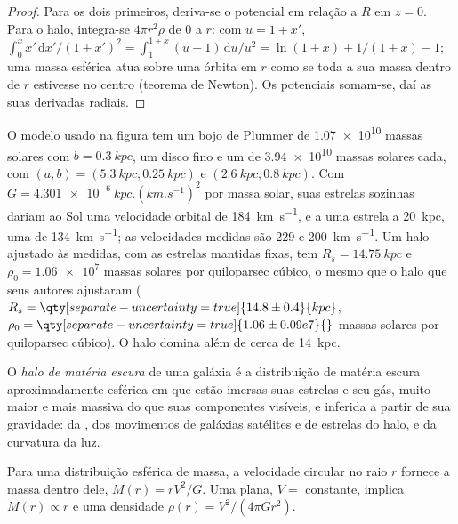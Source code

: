 \begin{proof}
Para os dois primeiros, deriva-se o potencial em relação a $R$ em
$z = 0$. Para o halo, integra-se $4\pi r^2\rho$ de 0 a $r$: com
$u = 1 + x'$, $\int_0^x x'\,\mathrm{d}x'/(1 + x')^2 =
\int_1^{1+x}(u - 1)\,\mathrm{d}u/u^2 = \ln(1 + x) + 1/(1 + x) - 1$; uma
massa esférica atua sobre uma órbita em $r$ como se toda a sua massa dentro de $r$ estivesse
no centro (teorema de Newton). Os potenciais somam-se, daí as suas
derivadas radiais.
\end{proof}

O modelo usado na figura tem um bojo de Plummer de
\num{1.07e10} massas solares com $b = \qty{0.3}{kpc}$, um disco fino e um
 de \num{3.94e10} massas solares cada, com $(a, b) =
(\qty{5.3}{kpc}, \qty{0.25}{kpc})$ e $(\qty{2.6}{kpc}, \qty{0.8}{kpc})$.
Com $G = \qty{4.301e-6}{kpc.(km.s^{-1})^2}$ por massa solar, suas estrelas
sozinhas dariam ao Sol uma velocidade orbital de \qty{184}{km.s^{-1}}, e
a uma estrela a \qty{20}{kpc}, uma de \qty{134}{km.s^{-1}}; as velocidades medidas são
229 e \qty{200}{km.s^{-1}}. Um halo ajustado às medidas, com as
estrelas mantidas fixas, tem $R_s = \qty{14.75}{kpc}$ e
$\rho_0 = \num{1.06e7}$ massas solares por quiloparsec cúbico, o mesmo que
o halo que seus autores ajustaram ($R_s = \qty[separate-uncertainty=true]{14.8 \pm 0.4}{kpc}$,
$\rho_0 = \qty[separate-uncertainty=true]{1.06 \pm 0.09 e7}{}$ massas solares
por quiloparsec cúbico). O halo domina além de cerca de \qty{14}{kpc}.

\begin{definition}\label{def:b3:milky-way-galaxies:halo}
O \emph{halo de matéria escura} de uma galáxia é a
distribuição de matéria escura aproximadamente esférica em que estão imersas suas estrelas e seu gás,
muito maior e mais massiva do que suas componentes visíveis,
e inferida a partir de sua gravidade: da , dos movimentos
de galáxias satélites e de estrelas do halo, e da curvatura da luz.
\end{definition}

\begin{theorem}\label{thm:b3:milky-way-galaxies:enclosed}
Para uma distribuição esférica de massa, a velocidade circular no raio $r$
fornece a massa dentro dele, $M(r) = rV^2/G$. Uma  plana,
$V = $ constante, implica $M(r) \propto r$ e uma densidade
$\rho(r) = V^2/(4\pi G r^2)$.
\end{theorem}

